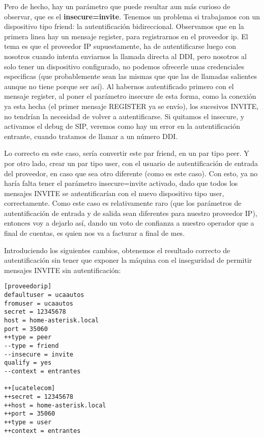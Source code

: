 Pero de hecho, hay un parámetro que puede resultar aun más curioso de observar, que es el \textbf{insecure=invite}. Tenemos un problema si trabajamos con un dispositivo tipo friend: la autentificación bidireccional. Observamos que en la primera linea hay un mensaje register, para registrarnos en el proveedor ip. El tema es que el proveedor IP supuestamente, ha de autentificarse luego con nosotros cuando intenta enviarnos la llamada directa al DDI, pero nosotros al solo tener un dispositivo configurado, no podemos ofrecerle unas credenciales especificas (que probablemente sean las mismas que que las de llamadas salientes aunque no tiene porque ser así). Al habernos autentificado primero con el mensaje register, al poner el parámetro insecure de esta forma, como la conexión ya esta hecha (el primer mensaje REGISTER ya se envío), los sucesivos INVITE, no tendrían la necesidad de volver a autentificarse. Si quitamos el insecure, y activamos el debug de SIP, veremos como hay un error en la autentificación entrante, cuando tratamos de llamar a un número DDI.

Lo correcto en este caso, sería convertir este par friend, en un par tipo peer. Y por otro lado, crear un par tipo user, con el usuario de autentificación de entrada del proveedor, en caso que sea otro diferente (como es este caso). Con esto, ya no haría falta tener el parámetro insecure=invite activado, dado que todos los mensajes INVITE se autentificarían con el nuevo dispositivo tipo user, correctamente. Como este caso es relativamente raro (que los parámetros de autentificación de entrada y de salida sean diferentes para nuestro proveedor IP), entonces voy a dejarlo así, dando un voto de confianza a nuestro operador que a final de cuentas, es quien nos va a facturar a final de mes.

Introduciendo los siguientes cambios, obtenemos el resultado correcto de autentificación sin tener que exponer la máquina con el inseguridad de permitir mensajes INVITE sin autentificación:

\begin{lstlisting}[style=bash,title={/etc/asterisk/sip.conf}]
[proveedorip]
defaultuser = ucaautos
fromuser = ucaautos
secret = 12345678
host = home-asterisk.local
port = 35060
++type = peer
--type = friend
--insecure = invite
qualify = yes
--context = entrantes

++[ucatelecom]
++secret = 12345678
++host = home-asterisk.local
++port = 35060
++type = user
++context = entrantes
\end{lstlisting}

